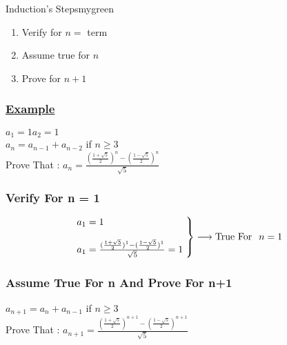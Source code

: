 \vspace{0.35cm}
\begin{prettyBox}{Induction's Steps}{mygreen}
\begin{enumerate}
    \item Verify for \(n =\) term
    \item Assume true for \(n\)
    \item Prove for \(n+1\)
\end{enumerate}
\end{prettyBox}

\vspace{0.35cm}
\subsubsection*{\underline{Example}}
\(a_1 = 1\)\hspace{0.5cm}\(a_2 = 1\)\\[0.25cm]
\(a_n = a_{n-1} + a_{n-2}\) \hspace{0.25cm} if \(n \geq 3\)\\[0.35cm]
Prove That : \(a_n = \frac{(\frac{1+\sqrt{5}}{2})^n - (\frac{1-\sqrt{5}}{2})^n}{\sqrt{5}}\)\\[0.5cm]

\subsubsection*{Verify For n = 1}

\vspace{0.35cm}
\[
\begin{rcases}
a_1  = 1\\[0.25cm]
a_1 = \frac{(\frac{1+\sqrt{5}}{2})^1 - (\frac{1-\sqrt{5}}{2})^1}{\sqrt{5}} = 1\hspace{0.1cm}
\end{rcases}\longrightarrow \text{True For} \hspace{0.25cm} n=1
\]

\newpage

\subsubsection*{Assume True For n And Prove For n+1}
\vspace{0.15cm}
\(a_{n+1} = a_{n} + a_{n-1}\) \hspace{0.25cm} if \(n \geq 3\)\\[0.35cm]
Prove That : \(a_{n+1} = \frac{\left(\frac{1+\sqrt{5}}{2}\right)^{n+1} - \left(\frac{1-\sqrt{5}}{2}\right)^{n+1}}{\sqrt{5}}\) 



